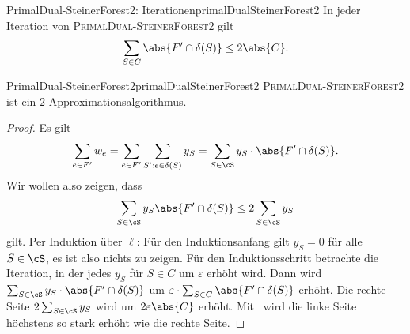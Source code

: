 \documentclass[language=ngerman,algolist]{TemplateLecture}
\begin{document}
\begin{lem}{PrimalDual-SteinerForest2: Iterationen}{primalDualSteinerForest2}
    In jeder Iteration von \textsc{PrimalDual-SteinerForest2} gilt
    \begin{equation*}
        \sum_{S \in C} \abs{F' \cap \delta(S)} \leq 2 \abs{C}.
    \end{equation*}
\end{lem}

\begin{thm}{PrimalDual-SteinerForest2}{primalDualSteinerForest2}
    \textsc{PrimalDual-SteinerForest2} ist ein $2$-Approximationsalgorithmus.
\end{thm}

\begin{proof}
    Es gilt 
    \begin{equation*}
        \sum_{e \in F'} w_e = \sum_{e \in F'} \sum_{S': e \in \delta(S)} y_S = \sum_{S \in \cS} y_S \cdot \abs{F' \cap \delta(S)}.
    \end{equation*}
    Wir wollen also zeigen, dass 
    \begin{equation*}
        \sum_{S \in \cS} y_S \abs{F' \cap \delta(S)} \leq 2 \sum_{S \in \cS} y_S %
    \end{equation*}
    gilt. Per Induktion über $\ell$: Für den Induktionsanfang gilt $y_S = 0$ für alle $S \in \cS$, es ist also nichts zu zeigen. Für den Induktionsschritt betrachte die Iteration, in der jedes $y_S$ für $S \in C$ um $\varepsilon$ erhöht wird. Dann wird $\sum_{S \in \cS} y_S \cdot \abs{F' \cap \delta(S)}$ um $\varepsilon \cdot \sum_{S \in C} \abs{F' \cap \delta(S)}$ erhöht. Die rechte Seite $2\sum_{S \in \cS} y_S$ wird um $2\varepsilon\abs{C}$ erhöht. Mit~ wird die linke Seite höchstens so stark erhöht wie die rechte Seite.
\end{proof}
\end{document}
